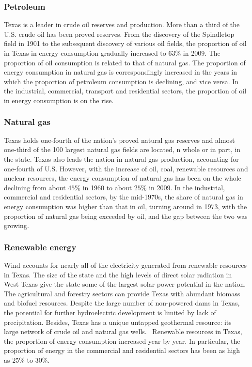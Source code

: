 \documentclass{mcmthesis}
\begin{document}
\subsubsection{Petroleum}
  Texas is a leader in crude oil reserves and production. More than a third of the U.S. crude oil has been proved reserves.
  From the discovery of the Spindletop field in 1901 to the subsequent discovery of various oil fields, the proportion of oil in Texas
  in energy consumption gradually increased to $63\%$ in 2009. The proportion of oil consumption is related to that of natural gas.
  The proportion of energy consumption in natural gas is correspondingly increased in the years in which the proportion of petroleum consumption
  is declining, and vice versa. In the industrial, commercial, transport and residential sectors, the proportion of oil in energy consumption is on the rise.
\subsubsection{Natural gas}
  Texas holds one-fourth of the nation's proved natural gas reserves and almost one-third of the 100 largest natural gas fields are located,
  n whole or in part, in the state. Texas also leads the nation in natural gas production, accounting for one-fourth of U.S. However,
  with the increase of oil, coal, renewable resources and nuclear resources, the energy consumption of natural gas has been on the
  whole declining from about $45\%$ in 1960 to about $25\%$ in 2009. In the industrial, commercial and residential sectors,
  by the mid-1970s, the share of natural gas in energy consumption was higher than that in oil, turning around in 1973,
  with the proportion of natural gas being exceeded by oil, and the gap between the two was growing.
\subsubsection{Renewable energy}
  Wind accounts for nearly all of the electricity generated from renewable resources in Texas. The size of the state and
  the high levels of direct solar radiation in West Texas give the state some of the largest solar power potential in the nation.
  The agricultural and forestry sectors can provide Texas with abundant biomass and biofuel resources.
  Despite the large number of non-powered dams in Texas, the potential for further hydroelectric development is limited by lack of precipitation.
  Besides, Texas has a unique untapped geothermal resource: its large network of crude oil and natural gas wells. 
  Renewable resources in Texas, the proportion of energy consumption increased year by year.
  In particular, the proportion of energy in the commercial and residential sectors has been as high as $25\%$ to $30\%$.
\end{document}
